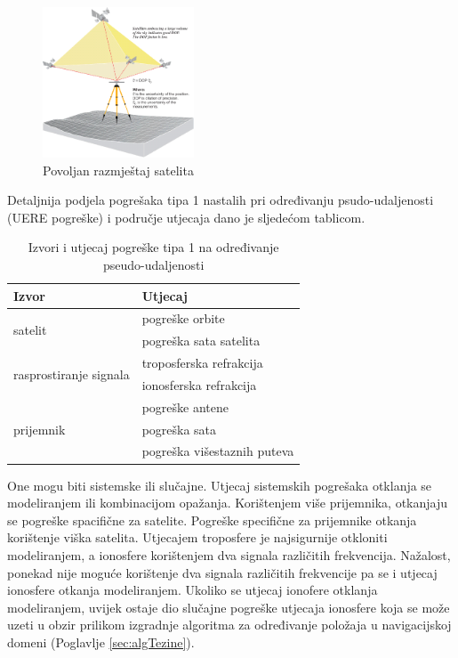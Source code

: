 \documentclass[a4paper,twoside,12pt]{memoir} %
\begin{document}
	\begin{figure}[H]
		\centering
		\includegraphics[width=0.4\textwidth]{DOPHigh}
		\caption{Povoljan razmještaj satelita}
		\label{fig:DOPHigh}
	\end{figure}
	
	
	
	Detaljnija podjela pogrešaka tipa 1 nastalih 
	pri određivanju psudo-udaljenosti (UERE pogreške) i područje utjecaja dano je sljedećom tablicom.
	
	\begin{table}[H]\centering
		\caption{Izvori i utjecaj pogreške tipa 1 na određivanje pseudo-udaljenosti}
		\begin{tabular}{ |p{3cm}|p{4cm}| }
			\hline
			\rowcolor{lightgray} Izvor & Utjecaj \\[0.5ex]
			\hline\hline
			\multirow{2}{4em}{satelit} & pogreške orbite  \\ 
			& pogreška sata satelita   \\ 
			\hline
			\multirow{2}{4em}{rasprostiranje signala} & troposferska refrakcija  \\ 
			& ionosferska refrakcija  \\
			\hline
			\multirow{4}{4em}{prijemnik} & pogreške antene  \\ 
			& pogreška sata\\ 
			\cline{2-2}
			& pogreška višestaznih puteva \\
			\hline
		\end{tabular}
	\end{table}	
	
	One mogu biti sistemske ili slučajne. %
	Utjecaj sistemskih pogrešaka otklanja se modeliranjem ili
	kombinacijom opažanja.
	Korištenjem više prijemnika, otkanjaju se pogreške spacifične za satelite.
	Pogreške specifične za prijemnike otkanja korištenje viška satelita.
	Utjecajem troposfere je najsigurnije otkloniti modeliranjem,
	a ionosfere korištenjem dva signala različitih frekvencija.
	Nažalost, ponekad nije moguće korištenje dva signala različitih frekvencije
	pa se i utjecaj ionosfere otkanja modeliranjem. Ukoliko se utjecaj ionofere otklanja
	modeliranjem, uvijek ostaje dio slučajne pogreške utjecaja ionosfere
	koja se može uzeti u obzir prilikom izgradnje algoritma za određivanje položaja
	u navigacijskoj domeni (Poglavlje \ref{sec:algTezine}).
	
\end{document}
